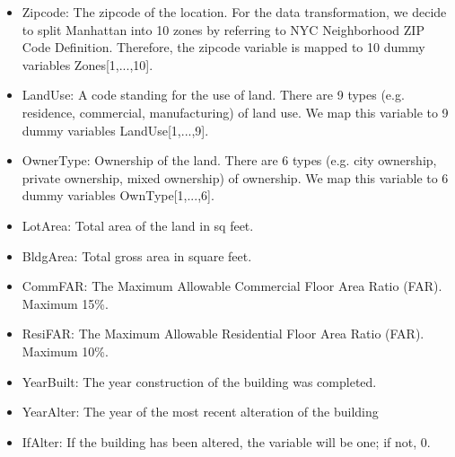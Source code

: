 \documentclass[11pt]{article}
\begin{document}
\begin{enumerate}
\begin{itemize}\setlength\itemsep{-0.1em}
\item Zipcode: The zipcode of the location. For the data transformation, we decide to split Manhattan into 10 zones by referring to NYC Neighborhood ZIP Code Definition. Therefore, the zipcode variable is mapped to 10 dummy variables Zones[1,...,10].
\item LandUse: A code standing for the use of land. There are 9 types (e.g. residence, commercial, manufacturing) of land use. We map this variable to 9 dummy variables LandUse[1,...,9].
\item OwnerType: Ownership of the land. There are 6 types (e.g. city ownership, private ownership, mixed ownership) of ownership. We map this variable to 6 dummy variables OwnType[1,...,6]. 
\item LotArea: Total area of the land in sq feet. 
\item BldgArea: Total gross area in square feet.
\item CommFAR: The Maximum Allowable Commercial Floor Area Ratio (FAR). Maximum 15\%.
\item ResiFAR: The Maximum Allowable Residential Floor Area Ratio (FAR). Maximum 10\%.
\item YearBuilt: The year construction of the building was completed.
\item YearAlter: The year of the most recent alteration of the building
\item IfAlter: If the building has been altered, the variable will be one; if not, 0.
\end{itemize}


\end{enumerate}
\end{document}

